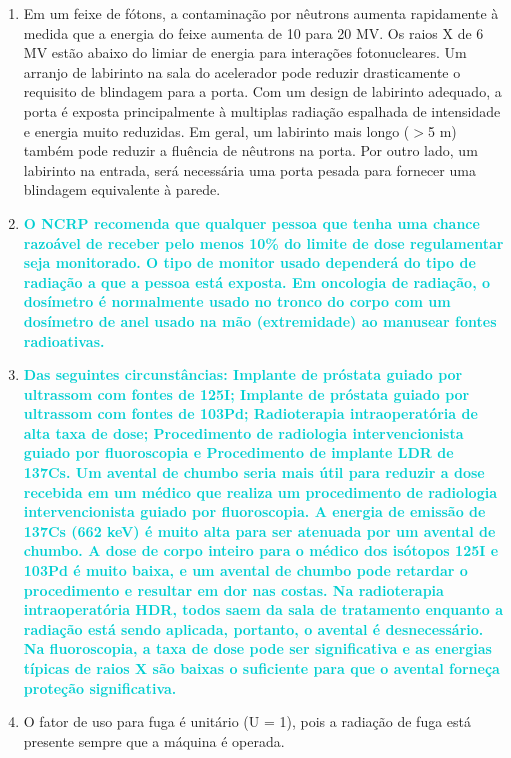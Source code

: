\documentclass[11pt,a4paper]{article}
\begin{document}
\begin{enumerate}
        \item Em um feixe de fótons, a contaminação por nêutrons aumenta rapidamente à medida que a energia do feixe aumenta de 10 para 20 MV. Os raios X de 6 MV estão abaixo do limiar de energia para interações fotonucleares. Um arranjo de labirinto na sala do acelerador pode reduzir drasticamente o requisito de blindagem para a porta. Com um design de labirinto adequado, a porta é exposta principalmente à multiplas radiação espalhada de intensidade e energia muito reduzidas. Em geral, um labirinto mais longo ($>$5 m) também pode reduzir a fluência de nêutrons na porta. Por outro lado, um labirinto na entrada, será necessária uma porta pesada para fornecer uma blindagem equivalente à parede.

        \item \textcolor{DarkTurquoise}{\textbf{O NCRP recomenda que qualquer pessoa que tenha uma chance razoável de receber pelo menos 10\% do limite de dose regulamentar seja monitorado. O tipo de monitor usado dependerá do tipo de radiação a que a pessoa está exposta. Em oncologia de radiação, o dosímetro é normalmente usado no tronco do corpo com um dosímetro de anel usado na mão (extremidade) ao manusear fontes radioativas.}}

        \item \textcolor{DarkTurquoise}{\textbf{Das seguintes circunstâncias: Implante de próstata guiado por ultrassom com fontes de 125I; Implante de próstata guiado por ultrassom com fontes de 103Pd; Radioterapia intraoperatória de alta taxa de dose; Procedimento de radiologia intervencionista guiado por fluoroscopia e Procedimento de implante LDR de 137Cs. Um avental de chumbo seria mais útil para reduzir a dose recebida em um médico que realiza um procedimento de radiologia intervencionista guiado por fluoroscopia. A energia de emissão de 137Cs (662 keV) é muito alta para ser atenuada por um avental de chumbo. A dose de corpo inteiro para o médico dos isótopos 125I e 103Pd é muito baixa, e um avental de chumbo pode retardar o procedimento e resultar em dor nas costas. Na radioterapia intraoperatória HDR, todos saem da sala de tratamento enquanto a radiação está sendo aplicada, portanto, o avental é desnecessário. Na fluoroscopia, a taxa de dose pode ser significativa e as energias típicas de raios X são baixas o suficiente para que o avental forneça proteção significativa.}}

        \item O fator de uso para fuga é unitário (U = 1), pois a radiação de fuga está presente sempre que a máquina é operada.


\end{enumerate}
\end{document}
